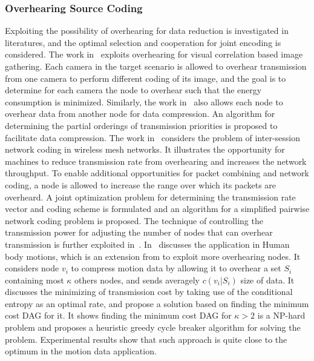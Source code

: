 \subsubsection{Overhearing Source Coding}
Exploiting the possibility of overhearing for data reduction is investigated in literatures, and the optimal selection and cooperation for joint encoding is considered.
The work in~\cite{imageModelCluster} exploits overhearing for visual correlation based image gathering.
Each camera in the target scenario is allowed to overhear transmission from one camera to perform different coding of its image, and the goal is to determine for each camera the node to overhear such that the energy consumption is minimized.
Similarly, the work in~\cite{BodyAreaSensorNetwork} also allows each node to overhear data from another node for data compression.
An algorithm for determining the partial orderings of transmission priorities is proposed to facilitate data compression.
The work in~\cite{InterSessionCoding} considers the problem of inter-session network coding in wireless mesh networks.
It illustrates the opportunity for machines to reduce transmission rate from overhearing and increases the network throughput.
To enable additional opportunities for packet combining and network coding, a node is allowed to increase the range over which its packets are overheard.
A joint optimization problem for determining the transmission rate vector and coding scheme is formulated and an algorithm for a simplified pairwise network coding problem is proposed.
The technique of controlling the transmission power for adjusting the number of nodes that can overhear transmission is further exploited in~\cite{BridgeMonitoring}.
In~\cite{SpatialCorrInBodySensorNetwork} discusses the application in Human body motions, which is an extension from\cite{BodyAreaSensorNetwork} to exploit more overhearing nodes.
It considers node $v_i$ to compress motion data by allowing it to overhear a set $S_i$ containing most $\kappa$ others nodes, and sends averagely $c(v_i|S_i)$ size of data.
It discusses the minimizing of transmission cost by taking use of the conditional entropy as an optimal rate, and propose a solution based on finding the minimum cost DAG for it.
It shows finding the minimum cost DAG for $\kappa > 2$ is a NP-hard problem and proposes a heuristic greedy cycle breaker algorithm for solving the problem.
Experimental results show that such approach is quite close to the optimum in the motion data application.
%